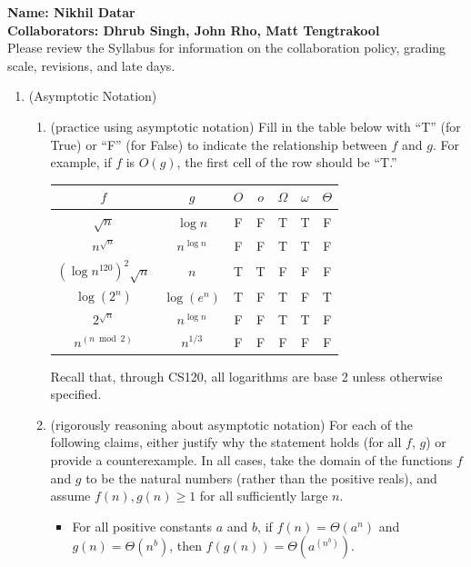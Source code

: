 \documentclass[11pt]{article}
\begin{document}

\textbf{Name: Nikhil Datar} \\

\textbf{Collaborators: Dhrub Singh, John Rho, Matt Tengtrakool} \\

Please review the Syllabus for information on the collaboration policy, grading scale, revisions, and late days.


\begin{enumerate}
    \item (Asymptotic Notation) 
    \begin{enumerate}
    \item (practice using asymptotic notation)
        Fill in the table below with ``T'' (for True) or ``F'' (for False) to indicate the relationship between $f$ and $g$. For example, if $f$ is $O(g)$, the first cell of the row should be ``T.'' \\
        \begin{table}[h!]
        \centering
        \bgroup
        \def\arraystretch{1.3}
        \begin{tabular}{||c | c || c | c | c | c | c ||}
         \hline
         $f$ & $g$ & $O$ & $o$ & $\Omega$ & $\omega$ & $\Theta$ \\
         \hline\hline
         $\sqrt{n}$ & $\log n$ & F & F & T & T & F\\ \hline
         $n^{\sqrt{n}}$ & $n^{\log n}$ & F & F & T & T &F\\ \hline
         $(\log {n^{120}})^2\sqrt{n}$ & $n$ & T & T & F& F&F \\ \hline
         $\log(2^n)$ & $\log(e^n)$ & T& F& T& F& T\\ \hline
         $2^{\sqrt{n}}$ & $n^{\log n}$ & F& F& T& T& F\\ \hline
         $n^{(n \bmod 2)}$ & $n^{1/3}$ & F& F& F& F& F\\ \hline
        \end{tabular}
        \egroup
        \end{table}
        Recall that, through CS120, all logarithms are base 2 unless otherwise specified. 
        
    \item  (rigorously reasoning about asymptotic notation)  
    For each of the following claims, either justify why the statement holds (for all $f$, $g$) or provide a counterexample. In all cases, take the domain of the functions $f$ and $g$ to be the natural numbers (rather than the positive reals), and assume $f(n), g(n)\geq 1$ for all sufficiently large $n$.
    \begin{itemize}
        \item For all positive constants $a$ and $b$, if $f(n) = \Theta(a^n)$ and $g(n) = \Theta(n^b)$, then $f(g(n)) = \Theta(a^{(n^b)})$. \\
        

\end{itemize}
\end{enumerate}
\end{enumerate}
\end{document}
